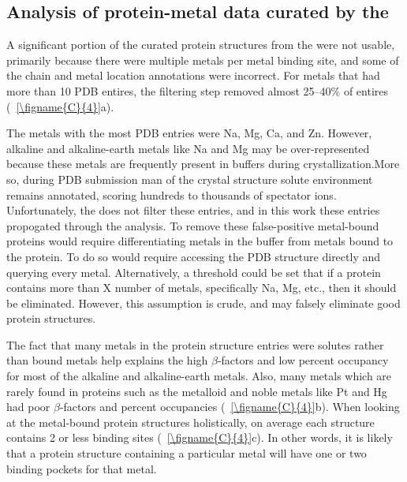 \documentclass[../main/main]{subfiles}
\begin{document}
\subsection{Analysis of protein-metal data curated by the \mPDB{}}
A significant portion of the curated protein structures from the \mPDB{} were not usable, primarily because there were multiple metals per metal binding site, and some of the chain and metal location annotations were incorrect. For metals that had more than 10 PDB entires, the filtering step removed almost 25--40\% of entires (\FIGURE~\ref{\figname{C}{4}}a).

The metals with the most PDB entries were Na, Mg, Ca, and Zn. However, alkaline and alkaline-earth metals like Na and Mg may be over-represented because these metals are frequently present in buffers during crystallization.More so, during PDB submission man of the crystal structure solute environment remains annotated, scoring hundreds to thousands of spectator ions. Unfortunately, the \mPDB{} does not filter these entries, and in this work these entries propogated through the analysis. To remove these false-positive metal-bound proteins would require differentiating metals in the buffer from metals bound to the protein. To do so would require accessing the PDB structure directly and querying every metal. Alternatively, a threshold could be set that if a protein contains more than X number of metals, specifically Na, Mg, etc., then it should be eliminated. However, this assumption is crude, and may falsely eliminate good protein structures.

The fact that many metals in the protein structure entries were solutes rather than bound metals help explains the high $\beta$-factors and low percent occupancy for most of the alkaline and alkaline-earth metals. Also, many metals which are rarely found in proteins such as the metalloid and noble metals like Pt and Hg had poor $\beta$-factors and percent occupancies (\FIGURE~\ref{\figname{C}{4}}b). When looking at the metal-bound protein structures holistically, on average each structure contains 2 or less binding sites (\FIGURE~\ref{\figname{C}{4}}c). In other words, it is likely that a protein structure containing a particular metal will have one or two binding pockets for that metal.
\end{document}
